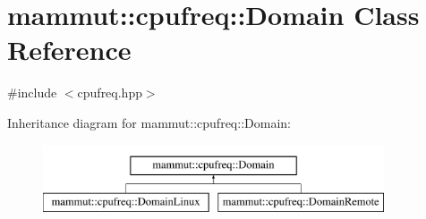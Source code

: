 \hypertarget{classmammut_1_1cpufreq_1_1Domain}{\section{mammut\-:\-:cpufreq\-:\-:Domain Class Reference}
\label{classmammut_1_1cpufreq_1_1Domain}
}


{\ttfamily \#include $<$cpufreq.\-hpp$>$}

Inheritance diagram for mammut\-:\-:cpufreq\-:\-:Domain\-:\begin{figure}[H]
\begin{center}
\leavevmode
\includegraphics[height=2.000000cm]{classmammut_1_1cpufreq_1_1Domain}
\end{center}
\end{figure}
